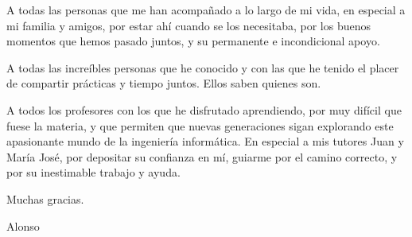 \documentclass[11pt,a4paper,titlepage,twoside,openright,openbib,spanish]{report}
\begin{document}


\paxinaenbranco
\begin{flushright}
\end{flushright}
\paxinaenbranco
\paxinaenbranco
\begin{agradecementos}
A todas las personas que me han acompañado a lo largo de mi vida, en especial a mi familia y amigos, por estar ahí cuando se los necesitaba, por los buenos momentos que hemos pasado juntos, y su permanente e incondicional apoyo.

A todas las increíbles personas que he conocido y con las que he tenido el placer de compartir prácticas y tiempo juntos. Ellos saben quienes son.

A todos los profesores con los que he disfrutado aprendiendo, por muy difícil que fuese la materia, y que permiten que nuevas generaciones sigan explorando este apasionante mundo de la ingeniería informática. En especial a mis tutores Juan y María José, por depositar su confianza en mí, guiarme por el camino correcto, y por su inestimable trabajo y ayuda.

Muchas gracias.

\begin{flushright}
Alonso
\end{flushright}
\end{agradecementos}
\pagestyle{empty}
\paxinaenbranco

\pagestyle{fancy}

\setcounter{page}{1}

\tableofcontents
\listoffigures
\listoftables
\cleardoublepage

\setcounter{page}{1}



% 
% 
% 
% 
% 
% 



\appendix
\appendixpage
% 
% 
% 

\printglossary[type=\acronymtype,title=\nomeglosarioacronimos]
\printglossary[title=\nomeglosariotermos]



\cleardoublepage
\end{document}
